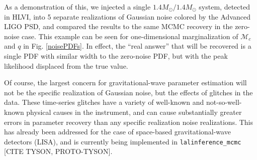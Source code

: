 \documentclass[11pt,a4paper]{emulateapj}
\newcommand{\carl}[1]{{\color{red}  #1}}
\newcommand{\chmass}{\mathcal{M}_c}
\begin{document}
As a demonstration of this, we injected a single $1.4M_{\odot}/1.4M_{\odot}$ system, 
detected in HLVI,  into 5 separate realizations of Gaussian noise colored by the Advanced LIGO PSD, 
and compared the results to the same MCMC recovery in the zero-noise case.  This example
can be seen for one-dimensional marginalization of $\chmass$ and $q$ in Fig. \ref{noisePDFs}.  In effect, the ``real answer'' that will be recovered is a single PDF with similar 
width to the zero-noise PDF, but with the peak likelihood displaced from the true value.  

Of course, the largest concern for gravitational-wave parameter estimation will not be the specific
realization of Gaussian noise, but the effects of glitches in the data.  These time-series 
glitches have a variety of well-known and not-so-well-known physical causes in the instrument,
and can cause substantially greater errors in parameter recovery than any specific realization noise realizations.  This has already been addressed for the case of space-based gravitational-wave
detectors (LISA), and is currently being implemented in \texttt{lalinference\_mcmc} 
\carl{[CITE TYSON, PROTO-TYSON]}.
\end{document}
